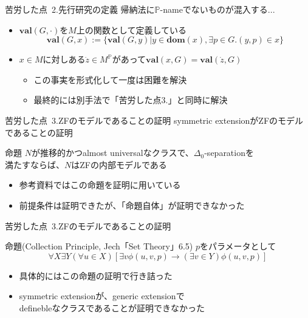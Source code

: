 \documentclass[17pt,aspectratio=169]{beamer}
\newcommand{\Pbb}{\mathbb{P}}
\begin{document}
\begin{frame}{苦労した点\, {\normalsize 2.先行研究の定義}}
    帰納法に$\Pbb$-nameでないものが混入する...
    {
    \small
    \begin{itemize}[itemsep=8pt]
        \item $\mathbf{val}(G, \cdot)$を$M$上の関数として定義している
              $$\mathbf{val}(G, x) := \{ \mathbf{val}(G, y) | y \in \mathbf{dom}(x), \exists p \in G. (y, p) \in x \}$$
        \item $x \in M$に対しある$\dot{z} \in M^\Pbb$があって$\mathbf{val}(x, G) = \mathbf{val}(\dot{z}, G)$
              \vspace{5pt}
              \begin{itemize}
                  \item この事実を形式化して一度は困難を解決
                  \item 最終的には別手法で「苦労した点3.」と同時に解決
              \end{itemize}
    \end{itemize}

    }
\end{frame}

\begin{frame}{苦労した点\, {\normalsize 3.ZFのモデルであることの証明}}
    symmetric extensionがZFのモデルであることの証明
    \begin{itembox}[l]{命題}
        {\small
            $N$が推移的かつalmost universalなクラスで、$\Delta_0$-separationを\\
            満たすならば、$N$はZFの内部モデルである
        }
    \end{itembox}
    {\small
    \begin{itemize}[itemsep=8pt]
        \item 参考資料ではこの命題を証明に用いている
        \item 前提条件は証明できたが、「命題自体」が証明できなかった
    \end{itemize}
    }
\end{frame}

\begin{frame}{苦労した点\, {\normalsize 3.ZFのモデルであることの証明}}

    \begin{itembox}[l]{命題(Collection Principle, Jech「Set Theory」6.5)}
        {\small $p$をパラメータとして}
        \vspace{-10pt}
        $$\forall X \exists Y (\forall u \in X)[\exists v \phi(u, v, p) \rightarrow (\exists v \in Y) \phi(u, v, p)]$$
    \end{itembox}

    \vspace{-5pt}
    {\small
        \begin{itemize}[itemsep=5pt]
            \item 具体的にはこの命題の証明で行き詰った
            \item symmetric extensionが、generic extensionで\\
                  definebleなクラスであることが証明できなかった
        \end{itemize}
    }

\end{frame}
\end{document}
